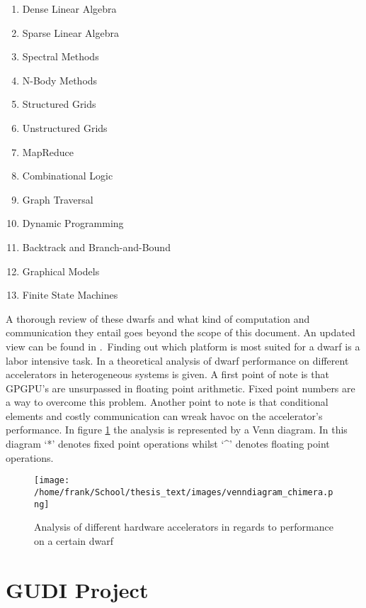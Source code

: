 \begin{multicols}{2}
\begin{enumerate}
\item Dense Linear Algebra
\item Sparse Linear Algebra
\item Spectral Methods
\item N-Body Methods
\item Structured Grids
\item Unstructured Grids
\item MapReduce
\item Combinational Logic
\item Graph Traversal
\item Dynamic Programming
\item Backtrack and Branch-and-Bound
\item Graphical Models
\item Finite State Machines
\end{enumerate}
\end{multicols}

A thorough review of these dwarfs and what kind of computation and communication they entail goes beyond the scope of this document. An updated view can be found in \cite{asanovic_view_2009}.\
Finding out which platform is most suited for a dwarf is a labor intensive task. In \cite{inta_chimera:_2012} a theoretical analysis of dwarf performance on different accelerators in heterogeneous systems is given. A first point of note is that GPGPU's are unsurpassed in floating point arithmetic. Fixed point numbers are a way to overcome this problem. Another point to note is that conditional elements and  costly communication can wreak havoc on the accelerator's performance. In figure \ref{img:venndiagram_chimera} the analysis is represented by a Venn diagram. In this diagram `*' denotes fixed point operations whilst `\^{}' denotes floating point operations.

\begin{figure}[H]
\centering
\texttt{[image: /home/frank/School/thesis\_text/images/venndiagram\_chimera.png]}
\caption{Analysis of different hardware accelerators in regards to performance on a certain dwarf \cite{inta_chimera:_2012} }
\label{img:venndiagram_chimera}
\end{figure}


\section{GUDI Project}

